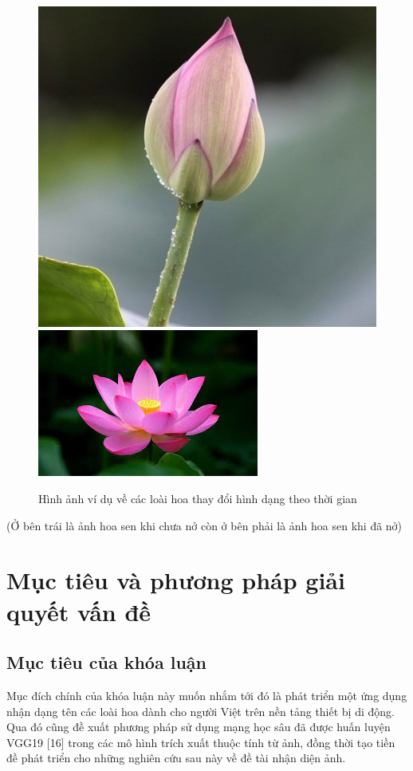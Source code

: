 \documentclass[12pt]{report}
\begin{document}
		\begin{figure}[h]
			\centering
			\includegraphics[scale=0.4]{anh_5}
			\includegraphics[scale=0.9]{anh_6}
			\caption{Hình ảnh ví dụ về các loài hoa thay đổi hình dạng theo thời gian}
			\label{fig:anh_1}
		\end{figure}
		(Ở bên trái là ảnh hoa sen khi chưa nở còn ở bên phải là ảnh hoa sen khi đã nở)
																								
		\section{Mục tiêu và phương pháp giải quyết vấn đề}
		\subsection{Mục tiêu của khóa luận}
																						
		Mục đích chính của khóa luận này muốn nhắm tới đó là phát triển một ứng dụng nhận dạng tên các loài hoa dành cho người Việt trên nền tảng thiết bị di động. Qua đó cũng đề xuất phương pháp sử dụng mạng học sâu đã được huấn luyện VGG19 [16] trong các mô hình trích xuất thuộc tính từ ảnh, đồng thời tạo tiền đề phát triển cho những nghiên cứu sau này về đề tài nhận diện ảnh.
																				
\end{document}
